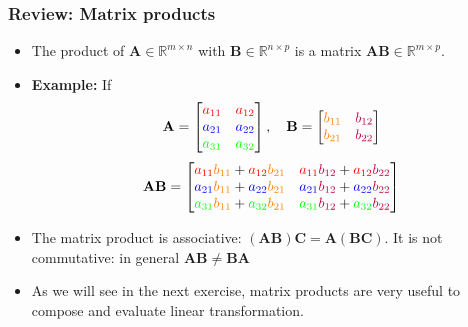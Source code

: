 \documentclass{beamer}
\begin{document}
\begin{frame}[t]
	\frametitle{Review: Matrix products}
	\begin{itemize}
	\item The product of $\mathbf{A} \in \mathbb{R}^{m \times n}$ with  $\mathbf{B} \in \mathbb{R}^{n \times p}$ is a matrix $\mathbf{A} \mathbf{B} \in \mathbb{R}^{m \times p}$. 
	\item \textbf{Example:} If 
	\begin{align*}
	\mathbf{A} = 
	\begin{bmatrix} 
	\textcolor{red}{a_{11}} & \textcolor{red}{a_{12}} \\
	\textcolor{blue}{a_{21}} & \textcolor{blue}{a_{22}} \\
	\textcolor{green}{a_{31}} & \textcolor{green}{a_{32}} 
	\end{bmatrix}, \quad 
	\mathbf{B} = 
	\begin{bmatrix} 
	\textcolor{orange}{b_{11}} & \textcolor{purple}{b_{12}} \\
	\textcolor{orange}{b_{21}} & \textcolor{purple}{b_{22}}
	\end{bmatrix}
	\end{align*}
	\begin{align*}
	\mathbf{A} \mathbf{B} =
	\begin{bmatrix}
	\textcolor{red}{a_{11}} \textcolor{orange}{b_{11}} + \textcolor{red}{a_{12}} \textcolor{orange}{b_{21}} & \textcolor{red}{a_{11}} \textcolor{purple}{b_{12}} + \textcolor{red}{a_{12}} \textcolor{purple}{b_{22}} \\
	\textcolor{blue}{a_{21}} \textcolor{orange}{b_{11}} + \textcolor{blue}{a_{22}} \textcolor{orange}{b_{21}} & \textcolor{blue}{a_{21}} \textcolor{purple}{b_{12}} + \textcolor{blue}{a_{22}} \textcolor{purple}{b_{22}} \\
	\textcolor{green}{a_{31}} \textcolor{orange}{b_{11}} + \textcolor{green}{a_{32}}  \textcolor{orange}{b_{21}} & \textcolor{green}{a_{31}} \textcolor{purple}{b_{12}} + \textcolor{green}{a_{32}} \textcolor{purple}{b_{22}}
	\end{bmatrix}
	\end{align*}
	\item The matrix product is associative: $(\mathbf{A} \mathbf{B}) \mathbf{C} = \mathbf{A} (\mathbf{B} \mathbf{C})$. It is not commutative: in general $\mathbf{A} \mathbf{B} \neq \mathbf{B} \mathbf{A}$
	\item As we will see in the next exercise, matrix products are very useful to compose and evaluate linear transformation.
	\end{itemize}
\end{frame}
\end{document}
